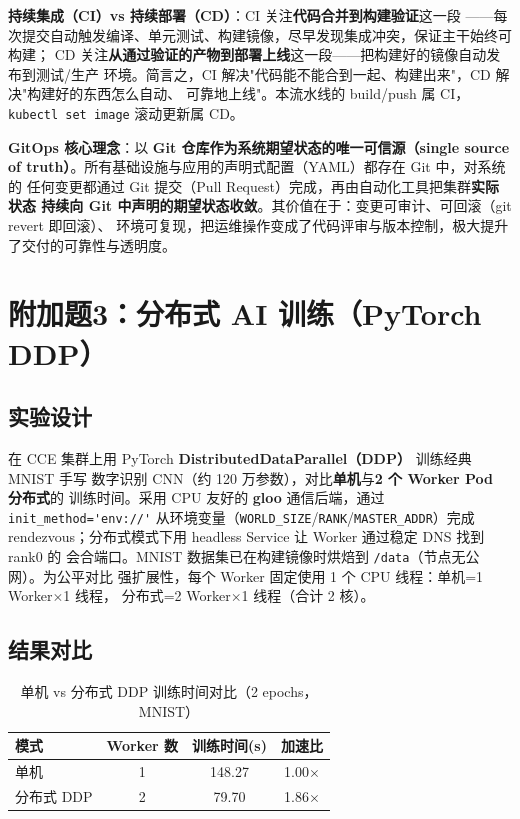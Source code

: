 \textbf{持续集成（CI）vs 持续部署（CD）}：CI 关注\textbf{代码合并到构建验证}这一段
——每次提交自动触发编译、单元测试、构建镜像，尽早发现集成冲突，保证主干始终可构建；
CD 关注\textbf{从通过验证的产物到部署上线}这一段——把构建好的镜像自动发布到测试/生产
环境。简言之，CI 解决"代码能不能合到一起、构建出来"，CD 解决"构建好的东西怎么自动、
可靠地上线"。本流水线的 build/push 属 CI，\lstinline!kubectl set image! 滚动更新属 CD。

\textbf{GitOps 核心理念}：以 \textbf{Git 仓库作为系统期望状态的唯一可信源（single
source of truth）}。所有基础设施与应用的声明式配置（YAML）都存在 Git 中，对系统的
任何变更都通过 Git 提交（Pull Request）完成，再由自动化工具把集群\textbf{实际状态
持续向 Git 中声明的期望状态收敛}。其价值在于：变更可审计、可回滚（git revert 即回滚）、
环境可复现，把运维操作变成了代码评审与版本控制，极大提升了交付的可靠性与透明度。

\section{附加题3：分布式 AI 训练（PyTorch DDP）}

\subsection{实验设计}

在 CCE 集群上用 PyTorch \textbf{DistributedDataParallel（DDP）} 训练经典 MNIST 手写
数字识别 CNN（约 120 万参数），对比\textbf{单机}与\textbf{2 个 Worker Pod 分布式}的
训练时间。采用 CPU 友好的 \textbf{gloo} 通信后端，通过 \lstinline!init_method='env://'!
从环境变量（\lstinline!WORLD_SIZE!/\lstinline!RANK!/\lstinline!MASTER_ADDR!）完成
rendezvous；分布式模式下用 headless Service 让 Worker 通过稳定 DNS 找到 rank0 的
会合端口。MNIST 数据集已在构建镜像时烘焙到 \lstinline!/data!（节点无公网）。为公平对比
强扩展性，每个 Worker 固定使用 1 个 CPU 线程：单机=1 Worker$\times$1 线程，
分布式=2 Worker$\times$1 线程（合计 2 核）。

\subsection{结果对比}

\begin{table}[htbp]\centering
\caption{单机 vs 分布式 DDP 训练时间对比（2 epochs，MNIST）}\label{tab:ddp}
\begin{tabular}{lccc}
\toprule
模式 & Worker 数 & 训练时间(s) & 加速比 \\
\midrule
单机     & 1 & 148.27 & 1.00$\times$ \\
分布式 DDP & 2 & 79.70  & 1.86$\times$ \\
\bottomrule
\end{tabular}
\end{table}

